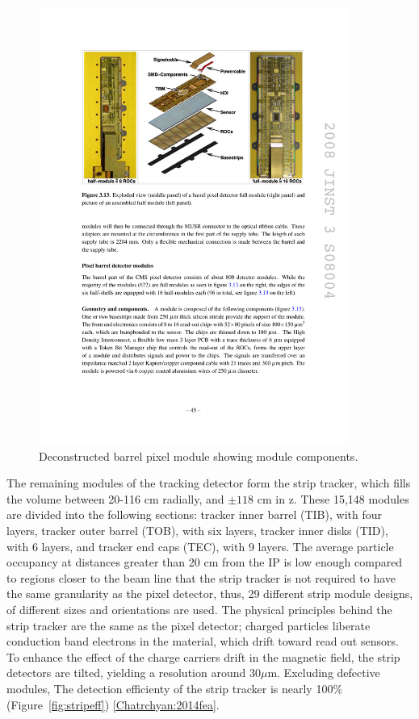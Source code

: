 \begin{figure}[tbh]
\centering
\includegraphics[width=4in]{figures/pixelmodule.pdf}
\caption{Deconstructed barrel pixel module showing module components.}
\label{fig:pixmodule}
\end{figure}

\indent The remaining modules of the tracking detector form the strip tracker, which fills the volume between 20-116 cm radially, and $\pm118$ cm in z. These 15,148 modules are divided into the following sections: tracker inner barrel (TIB), with four layers, tracker outer barrel (TOB), with six layers, tracker inner disks (TID), with 6 layers, and tracker end caps (TEC), with 9 layers. The average particle occupancy at distances greater than 20 cm from the IP is low enough compared to regions closer to the beam line that the strip tracker is not required to have the same granularity as the pixel detector, thus, 29 different strip module designs, of different sizes and orientations are used. The physical principles behind the strip tracker are the same as the pixel detector; charged particles liberate conduction band electrons in the material, which drift toward read out sensors. To enhance the effect of the charge carriers drift in the magnetic field, the strip detectors are tilted, yielding a resolution around 30$\mu$m. Excluding defective modules, The detection efficienty of the strip tracker is nearly 100\% (Figure~\ref{fig:stripeff}) \ref{Chatrchyan:2014fea}.

